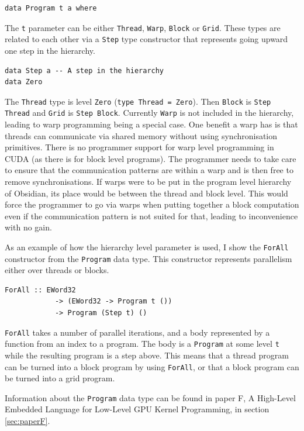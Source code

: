 \documentclass[a4paper]{book}
\newcommand{\paperFTitle}{A High-Level Embedded Language for Low-Level GPU Kernel Programming}
\begin{document}
\begin{verbatim} 
data Program t a where
\end{verbatim}

The {\tt t} parameter can be either {\tt Thread}, {\tt Warp}, {\tt Block} or {\tt Grid}.
These types are related to each other via a {\tt Step} type constructor that represents 
going upward one step in the hierarchy. 

\begin{verbatim} 
data Step a -- A step in the hierarchy
data Zero
\end{verbatim} 

The {\tt Thread} type is level {\tt Zero} ({\tt type Thread = Zero}). Then {\tt Block} is 
{\tt Step Thread} and {\tt Grid} is {\tt Step Block}. Currently {\tt Warp} is not included 
in the hierarchy, leading to warp programming being a special case. One benefit a warp has is 
that threads can communicate via shared memory without using synchronisation primitives. There 
is no programmer support for warp level programming in CUDA (as there is for block level 
programs). The programmer needs to take care to ensure that the communication patterns are 
within a warp and is then free to remove synchronisations. If warps were to be put in the 
program level hierarchy of Obsidian, its place would be between the thread and block level. 
This would force the programmer to go via warps when putting together a block computation even 
if the communication pattern is not suited for that, leading to inconvenience with no gain. 

As an example of how the hierarchy level parameter is used, I show the {\tt ForAll} constructor 
from the {\tt Program} data type.  This constructor represents parallelism either over threads 
or blocks. 

\begin{verbatim}
ForAll :: EWord32 
            -> (EWord32 -> Program t ())
            -> Program (Step t) ()
\end{verbatim}

{\tt ForAll} takes a number of parallel iterations, and a body represented by a function 
from an index to a program. The body is a {\tt Program} at some level {\tt t} while the 
resulting program is a step above. This means that a thread program can be turned into 
a block program by using {\tt ForAll}, or that a block program can be turned into a grid program. 

Information about the {\tt Program} data type can be found in paper F, \paperFTitle, in 
section \ref{sec:paperF}. 
\end{document}
